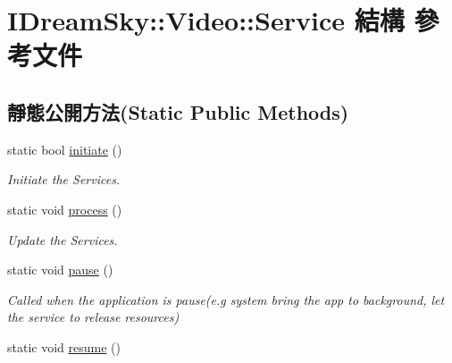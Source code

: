 \hypertarget{struct_i_dream_sky_1_1_video_1_1_service}{}\section{I\+Dream\+Sky\+:\+:Video\+:\+:Service 結構 參考文件}
\label{struct_i_dream_sky_1_1_video_1_1_service}
\subsection*{靜態公開方法(Static Public Methods)}
\begin{DoxyCompactItemize}
\item 
static bool \hyperlink{struct_i_dream_sky_1_1_video_1_1_service_af08d7e7475b0776426f2b88a68945595}{initiate} ()
\begin{DoxyCompactList}\small\item\em Initiate the Services. \end{DoxyCompactList}\item 
static void \hyperlink{struct_i_dream_sky_1_1_video_1_1_service_ab35b835bcaecc9b07353c4c715ffd1ec}{process} ()\hypertarget{struct_i_dream_sky_1_1_video_1_1_service_ab35b835bcaecc9b07353c4c715ffd1ec}{}\label{struct_i_dream_sky_1_1_video_1_1_service_ab35b835bcaecc9b07353c4c715ffd1ec}

\begin{DoxyCompactList}\small\item\em Update the Services. \end{DoxyCompactList}\item 
static void \hyperlink{struct_i_dream_sky_1_1_video_1_1_service_a01693610f3be5041716ce30be45e300c}{pause} ()\hypertarget{struct_i_dream_sky_1_1_video_1_1_service_a01693610f3be5041716ce30be45e300c}{}\label{struct_i_dream_sky_1_1_video_1_1_service_a01693610f3be5041716ce30be45e300c}

\begin{DoxyCompactList}\small\item\em Called when the application is pause(e.\+g system bring the app to background, let the service to release resources) \end{DoxyCompactList}\item 
static void \hyperlink{struct_i_dream_sky_1_1_video_1_1_service_a024f245c2ca9f9119ab286957950a4e3}{resume} ()\hypertarget{struct_i_dream_sky_1_1_video_1_1_service_a024f245c2ca9f9119ab286957950a4e3}{}\label{struct_i_dream_sky_1_1_video_1_1_service_a024f245c2ca9f9119ab286957950a4e3}


\end{DoxyCompactItemize}
